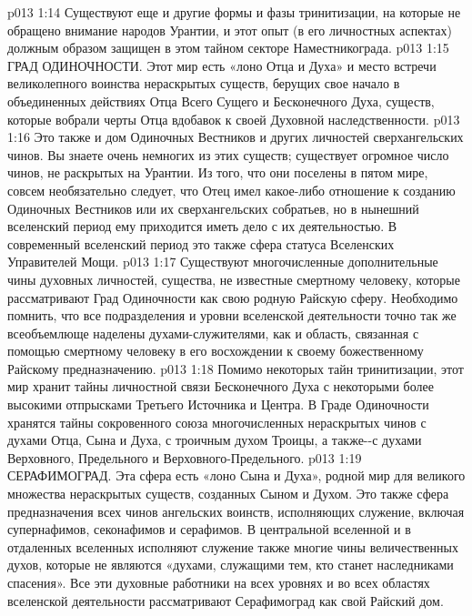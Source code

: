 \vs p013 1:14 Существуют еще и другие формы и фазы тринитизации, на которые не обращено внимание народов Урантии, и этот опыт (в его личностных аспектах) должным образом защищен в этом тайном секторе Наместникограда.
\vs p013 1:15 \pc {}\bibnobreakspace ГРАД ОДИНОЧНОСТИ. Этот мир есть «лоно Отца и Духа» и место встречи великолепного воинства нераскрытых существ, берущих свое начало в объединенных действиях Отца Всего Сущего и Бесконечного Духа, существ, которые вобрали черты Отца вдобавок к своей Духовной наследственности.
\vs p013 1:16 Это также и дом Одиночных Вестников и других личностей сверхангельских чинов. Вы знаете очень немногих из этих существ; существует огромное число чинов, не раскрытых на Урантии. Из того, что они поселены в пятом мире, совсем необязательно следует, что Отец имел какое\hyp{}либо отношение к созданию Одиночных Вестников или их сверхангельских собратьев, но в нынешний вселенский период ему приходится иметь дело с их деятельностью. В современный вселенский период это также сфера статуса Вселенских Управителей Мощи.
\vs p013 1:17 Существуют многочисленные дополнительные чины духовных личностей, существа, не известные смертному человеку, которые рассматривают Град Одиночности как свою родную Райскую сферу. Необходимо помнить, что все подразделения и уровни вселенской деятельности точно так же всеобъемлюще наделены духами\hyp{}служителями, как и область, связанная с помощью смертному человеку в его восхождении к своему божественному Райскому предназначению.
\vs p013 1:18 \pc {} Помимо некоторых тайн тринитизации, этот мир хранит тайны личностной связи Бесконечного Духа с некоторыми более высокими отпрысками Третьего Источника и Центра. В Граде Одиночности хранятся тайны сокровенного союза многочисленных нераскрытых чинов с духами Отца, Сына и Духа, с троичным духом Троицы, а также\hyp{}\hyp{}с духами Верховного, Предельного и Верховного\hyp{}Предельного.
\vs p013 1:19 \pc {}\bibnobreakspace СЕРАФИМОГРАД. Эта сфера есть «лоно Сына и Духа», родной мир для великого множества нераскрытых существ, созданных Сыном и Духом. Это также сфера предназначения всех чинов ангельских воинств, исполняющих служение, включая супернафимов, секонафимов и серафимов. В центральной вселенной и в отдаленных вселенных исполняют служение также многие чины величественных духов, которые не являются «духами, служащими тем, кто станет наследниками спасения». Все эти духовные работники на всех уровнях и во всех областях вселенской деятельности рассматривают Серафимоград как свой Райский дом.
